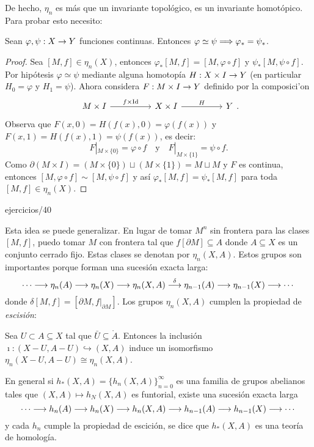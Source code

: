 \documentclass[../../topologia_algebraica]{subfiles}
\begin{document}
De hecho, $\eta_n$ es m\'as que un invariante topol\'ogico, es un invariante homot\'opico. Para
probar esto necesito:

\begin{prop}
  Sean $\varphi,\psi:X\rightarrow Y$ funciones continuas. Entonces $\varphi\simeq\psi\Longrightarrow\varphi_*=\psi_*$.
\end{prop}
\begin{proof}
  Sea $[M,f]\in\eta_n(X)$, entonces $\varphi_*[M,f]=[M,\varphi\circ f]$ y $\psi_*[M,\psi\circ f]$.
  Por hip\'otesis $\varphi\simeq\psi$ mediante alguna homotop\'ia $H:X\times I\rightarrow Y$ (en particular
  $H_0=\varphi$ y $H_1=\psi$). Ahora considera $F:M\times I\rightarrow Y$ definido por la composici'on
  \[
    \begin{tikzcd}
      M\times I \arrow[rr,"f\times\Id"] && X\times I \arrow[rr,"H"] && Y
    \end{tikzcd}.
  \]
  Observa que $F(x,0)=H(f(x),0)=\varphi(f(x))$ y $F(x,1)=H(f(x),1)=\psi(f(x))$, es decir:
  \[
    F|_{M\times\{0\}}=\varphi\circ f \quad\text{y}\quad F|_{M\times\{1\}}=\psi\circ f.
  \]
  Como $\partial(M\times I)=(M\times\{0\})\sqcup(M\times\{1\})=M\sqcup M$ y $F$ es continua, entonces
  $[M,\varphi\circ f]\sim[M,\psi\circ f]$ y as\'i $\varphi_*[M,f]=\psi_*[M,f]$ para toda
  $[M,f]\in\eta_n(X)$.
\end{proof}

{ejercicios/40} %

Esta idea se puede generalizar. En lugar de tomar $M^n$ sin frontera para las clases $[M,f]$, puedo
tomar $M$ con frontera tal que $f[\partial M]\subseteq A$ donde $A\subseteq X$ es un conjunto
cerrado fijo. Estas clases se denotan por $\eta_n(X,A)$. Estos grupos son importantes porque
forman una sucesi\'on exacta larga:
\[
  \cdots \longrightarrow \eta_n(A) \longrightarrow \eta_n(X) \longrightarrow \eta_n(X,A) \overset{\delta}{\longrightarrow}
  \eta_{n-1}(A)\longrightarrow \eta_{n-1}(X) \longrightarrow \cdots
\]
donde $\delta[M,f]=[\partial M,f|_{\partial M}]$. Los grupos $\eta_n(X,A)$ cumplen la propiedad
de \emph{escisi\'on}:

\begin{thm}
  Sea $U\subset A\subseteq X$ tal que $\bar{U}\subseteq\mathring{A}$. Entonces la inclusi\'on
  $\imath:(X-U,A-U)\hookrightarrow (X,A)$ induce un isomorfismo $\eta_n(X-U,A-U)\cong\eta_n(X,A)$.
\end{thm}

En general si $h_*(X,A)=\{h_n(X,A)\}_{n=0}^{\infty}$ es una familia de grupos abelianos tales que
$(X,A)\mapsto h_N(X,A)$ es funtorial, existe una sucesi\'on exacta larga
\[
  \cdots \longrightarrow h_n(A) \longrightarrow h_n(X) \longrightarrow h_n(X,A) \longrightarrow h_{n-1}(A)\longrightarrow h_{n-1}(X) \longrightarrow \cdots
\]
y cada $h_n$ cumple la propiedad de escici\'on, se dice que $h_*(X,A)$ es una teor\'ia de
homolog\'ia.
\end{document}
